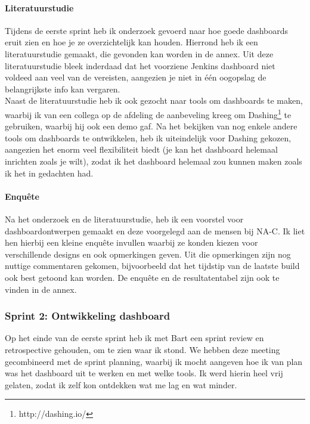 \documentclass[10pt,a4paper]{article}
\begin{document}
\paragraph{Literatuurstudie} Tijdens de eerste sprint heb ik onderzoek gevoerd naar hoe goede dashboards eruit zien en hoe je ze overzichtelijk kan houden. Hierrond heb ik een literatuurstudie gemaakt, die gevonden kan worden in de annex.   Uit deze literatuurstudie bleek inderdaad dat het voorziene Jenkins dashboard niet voldeed aan veel van de vereisten, aangezien je niet in \'e\'en oogopslag de belangrijkste info kan vergaren.\\
Naast de literatuurstudie heb ik ook gezocht naar tools om dashboards te maken, waarbij ik van een collega op de afdeling de aanbeveling kreeg om Dashing\footnote{http://dashing.io/} te gebruiken, waarbij hij ook een demo gaf.  Na het bekijken van nog enkele andere tools om dashboards te ontwikkelen, heb ik uiteindelijk voor Dashing gekozen, aangezien het enorm veel flexibiliteit biedt (je kan het dashboard helemaal inrichten zoals je wilt),  zodat ik het dashboard helemaal zou kunnen maken zoals ik het in gedachten had. 
\paragraph{Enqu\^ete}
Na het onderzoek en de literatuurstudie, heb ik een voorstel voor dashboardontwerpen gemaakt en deze voorgelegd aan de mensen bij NA-C. Ik liet hen hierbij een kleine enqu\^ete invullen waarbij ze konden kiezen voor verschillende designs en ook opmerkingen geven. Uit die opmerkingen zijn nog nuttige commentaren gekomen, bijvoorbeeld dat het tijdstip van de laatste build ook best getoond kan worden. De enqu\^ete en de resultatentabel zijn ook te vinden in de annex. 
\subsubsection{Sprint 2: Ontwikkeling dashboard} 
\label{sprint2}
Op het einde van de eerste sprint heb ik met Bart een sprint review en retrospective gehouden, om te zien waar ik stond. We hebben deze meeting gecombineerd met de sprint planning, waarbij ik mocht aangeven hoe ik van plan was het dashboard uit te werken en met welke tools. Ik werd hierin heel vrij gelaten, zodat ik zelf kon ontdekken wat me lag en wat minder. 
\end{document}

